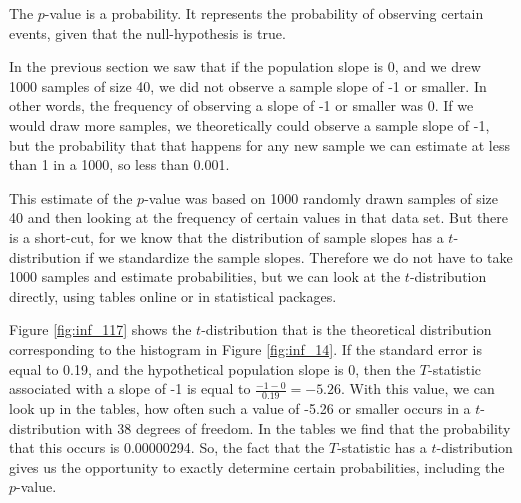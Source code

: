 \documentclass[]{report}\usepackage[]{graphicx}\usepackage[]{color}
\begin{document}
The $p$-value is a probability. It represents the probability of observing certain events, given that the null-hypothesis is true.

In the previous section we saw that if the population slope is 0, and we drew 1000 samples of size 40, we did not observe a sample slope of -1 or smaller. In other words, the frequency of observing a slope of -1 or smaller was 0. If we would draw more samples, we theoretically could observe a sample slope of -1, but the probability that that happens for any new sample we can estimate at less than 1 in a 1000, so less than 0.001.

This estimate of the $p$-value was based on 1000 randomly drawn samples of size 40 and then looking at the frequency of certain values in that data set. But there is a short-cut, for we know that the distribution of sample slopes has a $t$-distribution if we standardize the sample slopes. Therefore we do not have to take 1000 samples and estimate probabilities, but we can look at the $t$-distribution directly, using tables online or in statistical packages.

Figure \ref{fig:inf_117} shows the $t$-distribution that is the theoretical distribution corresponding to the histogram in Figure \ref{fig:inf_14}. If the standard error is equal to 0.19, and the hypothetical population slope is 0, then the $T$-statistic associated with a slope of -1 is equal to $\frac{-1-0}{0.19}=-5.26$. With this value, we can look up in the tables, how often such a value of -5.26 or smaller occurs in a $t$-distribution with 38 degrees of freedom. In the tables we find that the probability that this occurs is 0.00000294. So, the fact that the $T$-statistic has a $t$-distribution gives us the opportunity to exactly determine certain probabilities, including the $p$-value.
\end{document}
